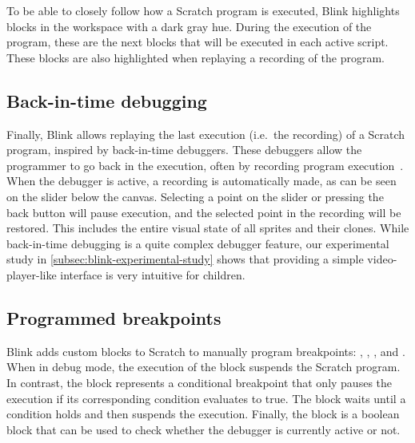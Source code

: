 \documentclass[../main]{subfiles}
\begin{document}
To be able to closely follow how a Scratch program is executed, Blink highlights blocks in the workspace with a dark gray hue.
During the execution of the program, these are the next blocks that will be executed in each active script.
These blocks are also highlighted when replaying a recording of the program.

\subsection{Back-in-time debugging}\label{subsec:back-in-time-debugging}
Finally, Blink allows replaying the last execution (i.e.\ the recording) of a Scratch program, inspired by back-in-time debuggers.
These debuggers allow the programmer to go back in the execution, often by recording program execution~\autocite{barrTardisAffordableTimetravel2014a,barrTimetravelDebuggingJavaScript2016a,czaplickiAsynchronousFunctionalReactive2013a,balzerEXDAMSExtendableDebugging1969,ungarDebuggingExperienceImmediacy1997,chenReversibleDebuggingUsing2001,crescenziReversibleExecutionVisualization2000}.
When the debugger is active, a recording is automatically made, as can be seen on the slider below the canvas.
Selecting a point on the slider or pressing the back button will pause execution, and the selected point in the recording will be restored.
This includes the entire visual state of all sprites and their clones.
While back-in-time debugging is a quite complex debugger feature, our experimental study in \cref{subsec:blink-experimental-study} shows that providing a simple video-player-like interface is very intuitive for children.

\subsection{Programmed breakpoints}\label{subsec:programmed-breakpoints}
Blink adds custom blocks to Scratch to manually program breakpoints: , , , and .
When in debug mode, the execution of the  block suspends the Scratch program.
In contrast, the  block represents a conditional breakpoint that only pauses the execution if its corresponding condition evaluates to true.
The  block waits until a condition holds and then suspends the execution.
Finally, the  block is a boolean block that can be used to check whether the debugger is currently active or not.
\end{document}
